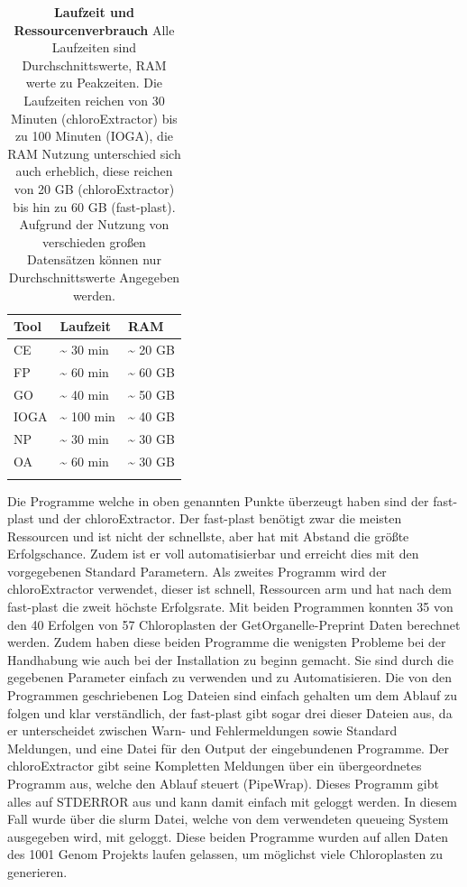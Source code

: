 \documentclass{scrartcl}
\begin{document}
\begin{table}[!h]
\caption[Laufzeit und Ressourcenverbrauch]{\textbf{Laufzeit und Ressourcenverbrauch} Alle Laufzeiten sind Durchschnittswerte, RAM werte zu Peakzeiten. Die Laufzeiten reichen von 30 Minuten (chloroExtractor) bis zu 100 Minuten (IOGA), die RAM Nutzung unterschied sich auch erheblich, diese reichen von 20 GB (chloroExtractor) bis hin zu 60 GB (fast-plast). Aufgrund der Nutzung von verschieden großen Datensätzen können nur Durchschnittswerte Angegeben werden.}
\begin{center}
\begin{tabular}{lll}
Tool & Laufzeit & RAM\\
\hline
CE & \textasciitilde{}  30 min & \textasciitilde{} 20 GB\\
FP & \textasciitilde{}  60 min & \textasciitilde{} 60 GB\\
GO & \textasciitilde{}  40 min & \textasciitilde{} 50 GB\\
IOGA & \textasciitilde{} 100 min & \textasciitilde{} 40 GB\\
NP & \textasciitilde{}  30 min & \textasciitilde{} 30 GB\\
OA & \textasciitilde{}  60 min & \textasciitilde{} 30 GB\\
 &  & \\
\end{tabular}
\end{center}
\end{table}
Die Programme welche in oben genannten Punkte überzeugt haben sind der fast-plast und der chloroExtractor. Der fast-plast benötigt zwar die 
meisten Ressourcen und ist nicht der schnellste, aber hat mit Abstand die größte Erfolgschance. Zudem ist er voll automatisierbar und erreicht 
dies mit den vorgegebenen Standard Parametern. Als zweites Programm wird der chloroExtractor verwendet, dieser ist schnell, Ressourcen arm und hat nach dem
fast-plast die zweit höchste Erfolgsrate. Mit beiden Programmen konnten 35 von den 40 Erfolgen von 57 Chloroplasten der GetOrganelle-Preprint Daten berechnet werden.
Zudem haben diese beiden Programme die wenigsten
Probleme bei der Handhabung wie auch bei der Installation zu beginn gemacht. Sie sind durch die gegebenen Parameter einfach zu verwenden und zu Automatisieren.
Die von den Programmen geschriebenen Log Dateien sind einfach gehalten um dem Ablauf zu folgen und klar verständlich, der fast-plast gibt sogar drei dieser
Dateien aus, da er unterscheidet zwischen Warn- und Fehlermeldungen sowie Standard Meldungen, und eine Datei für den Output der eingebundenen Programme. 
Der chloroExtractor gibt seine Kompletten Meldungen über ein übergeordnetes Programm aus, welche den Ablauf steuert (PipeWrap). Dieses Programm gibt alles auf STDERROR aus und 
kann damit einfach mit geloggt werden. In diesem Fall wurde über die slurm Datei, welche von dem verwendeten queueing System ausgegeben wird, mit geloggt. 
Diese beiden Programme wurden auf allen Daten des 1001 Genom Projekts laufen gelassen, um möglichst viele Chloroplasten zu generieren. 
\end{document}
